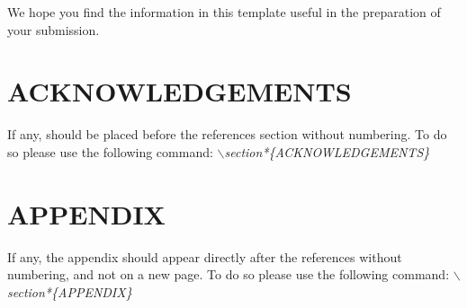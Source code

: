 \documentclass[a4paper,twoside]{article}
\begin{document}
We hope you find the information in this template useful in the preparation of your submission.

\section*{\uppercase{Acknowledgements}}

\noindent If any, should be placed before the references section
without numbering. To do so please use the following command:
\textit{$\backslash$section*\{ACKNOWLEDGEMENTS\}}


\vfill

{\small
}


\section*{\uppercase{Appendix}}

\noindent If any, the appendix should appear directly after the
references without numbering, and not on a new page. To do so please use the following command:
\textit{$\backslash$section*\{APPENDIX\}}

\vfill
\end{document}
